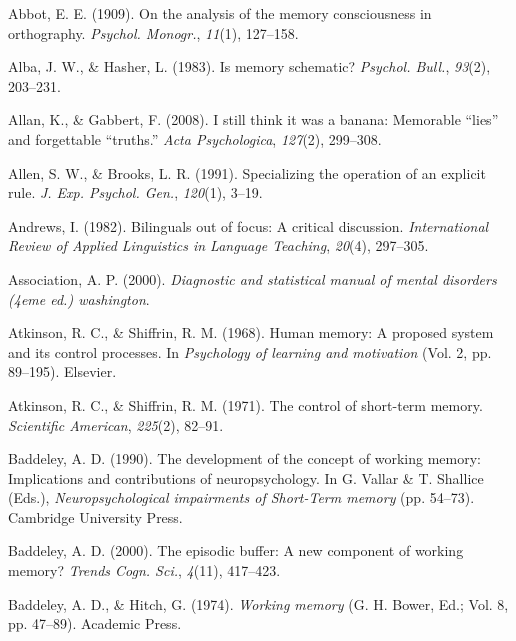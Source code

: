 \documentclass[
]{krantz}
\newlength{\cslhangindent}
\newenvironment{CSLReferences}[2] %
 {\begin{list}{}{%
  \setlength{\itemindent}{0pt}
  \setlength{\leftmargin}{0pt}
  \setlength{\parsep}{0pt}
  \ifodd #1
   \setlength{\leftmargin}{\cslhangindent}
   \setlength{\itemindent}{-1\cslhangindent}
  \fi
  \setlength{\itemsep}{#2\baselineskip}}}
 {\end{list}}
\begin{document}
\label{refs}
\begin{CSLReferences}{1}{0}
Abbot, E. E. (1909). On the analysis of the memory consciousness in orthography. \emph{Psychol. Monogr.}, \emph{11}(1), 127--158.

Alba, J. W., \& Hasher, L. (1983). Is memory schematic? \emph{Psychol. Bull.}, \emph{93}(2), 203--231.

Allan, K., \& Gabbert, F. (2008). I still think it was a banana: Memorable {``lies''} and forgettable {``truths.''} \emph{Acta Psychologica}, \emph{127}(2), 299--308.

Allen, S. W., \& Brooks, L. R. (1991). Specializing the operation of an explicit rule. \emph{J. Exp. Psychol. Gen.}, \emph{120}(1), 3--19.

Andrews, I. (1982). Bilinguals out of focus: A critical discussion. \emph{International Review of Applied Linguistics in Language Teaching}, \emph{20}(4), 297--305.

Association, A. P. (2000). \emph{Diagnostic and statistical manual of mental disorders (4eme ed.) washington}.

Atkinson, R. C., \& Shiffrin, R. M. (1968). Human memory: A proposed system and its control processes. In \emph{Psychology of learning and motivation} (Vol. 2, pp. 89--195). Elsevier.

Atkinson, R. C., \& Shiffrin, R. M. (1971). The control of short-term memory. \emph{Scientific American}, \emph{225}(2), 82--91.

Baddeley, A. D. (1990). The development of the concept of working memory: Implications and contributions of neuropsychology. In G. Vallar \& T. Shallice (Eds.), \emph{Neuropsychological impairments of {Short-Term} memory} (pp. 54--73). Cambridge University Press.

Baddeley, A. D. (2000). The episodic buffer: A new component of working memory? \emph{Trends Cogn. Sci.}, \emph{4}(11), 417--423.

Baddeley, A. D., \& Hitch, G. (1974). \emph{Working memory} (G. H. Bower, Ed.; Vol. 8, pp. 47--89). Academic Press.


\end{CSLReferences}
\end{document}
